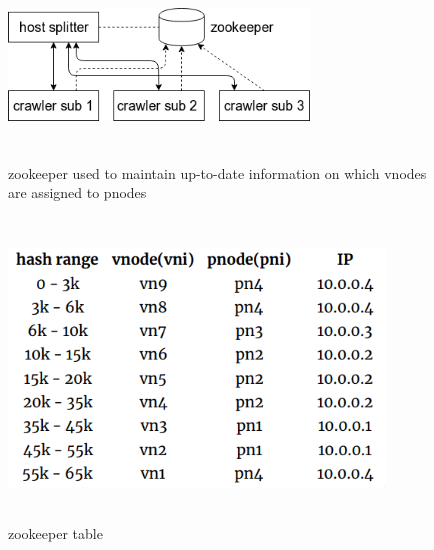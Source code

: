 \pagebreak

\begin{figure}[h!]
  \centering
  \includegraphics[width=8cm,height=5cm,keepaspectratio]{../media/crawler/zookeeper.png}
  \caption{zookeeper used to maintain up-to-date information on which vnodes are assigned to pnodes}
  \label{fig:zookeeper}
\end{figure}

\begin{figure}[h!]
  \centering
  \includegraphics[width=10cm,height=8cm,keepaspectratio]{../media/crawler/zookeeper_info.png}
  \caption{zookeeper table}
  \label{fig:zookeeper_info}
\end{figure}

\pagebreak
